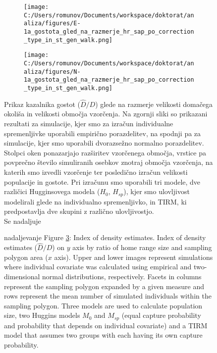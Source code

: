 \begin{figure}[H]
  \centering
  \begin{subfigure}[b]{1\textwidth}
    \centering
    \texttt{[image: C:/Users/romunov/Documents/workspace/doktorat/analiza/figures/E-1a\_gostota\_gled\_na\_razmerje\_hr\_sap\_po\_correction\_type\_in\_st\_gen\_walk.png]}
    \label{sli:sub7.1}
  \end{subfigure}

  \begin{subfigure}[b]{1\textwidth}
    \centering
    \texttt{[image: C:/Users/romunov/Documents/workspace/doktorat/analiza/figures/N-1a\_gostota\_gled\_na\_razmerje\_hr\_sap\_po\_correction\_type\_in\_st\_gen\_walk.png]}
    \label{sli:sub7.2}
  \end{subfigure}
  \caption[Prikaz kazalnika gostot]{Prikaz kazalnika gostot ($\hat{D}/D$) glede na razmerje velikosti domačega okoliša in velikosti območja vzorčenja. Na zgornji sliki so prikazani rezultati za simulacije, kjer smo za izračun individualne spremenljivke uporabili empirično porazdelitev, na spodnji pa za simulacije, kjer smo uporabili dvorazsežno normalno porazdelitev. Stolpci oken ponazarjajo razširitev vzorčenega območja, vrstice pa povprečno število simuliranih osebkov znotraj območja vzorčenja, na katerih smo izvedli vzorčenje ter posledično izračun velikosti populacije in gostote. Pri izračunu smo uporabili tri modele, dve različici Hugginsovega modela ($H_0$, $H_{sp}$), kjer smo ulovljivost modelirali glede na individualno spremenljivko, in TIRM, ki predpostavlja dve skupini z različno ulovljivostjo.\\
  Se nadaljuje}
  \label{sli:slika7}
\end{figure}
\begin{figure}\ContinuedFloat
\caption*{nadaljevanje Figure \ref{sli:slika7}: Index of density estimates. Index of density estimates ($\hat{D}/D$) on $y$ axis by ratio of home range size and sampling polygon area ($x$ axis). Upper and lower images represent simulations where individual covariate was calculated using empirical and two-dimensional normal distributions, respectively. Facets in columns represent the sampling polygon expanded by a given measure and rows represent the mean number of simulated individuals within the sampling polygon. Three models are used to calculate population size, two Huggins models $M_0$ and $M_{sp}$ (equal capture probability and probability that depends on individual covariate) and a TIRM model that assumes two groups with each having its own capture probability.}
\end{figure}

